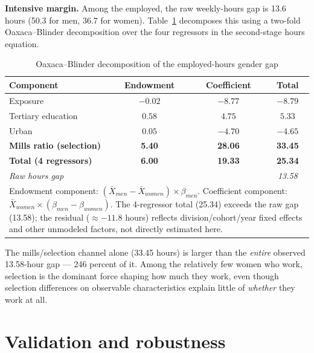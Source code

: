 \documentclass[11pt]{article}
\begin{document}
\textbf{Intensive margin.} Among the employed, the raw weekly-hours gap is 13.6 hours (50.3 for men, 36.7 for women). Table~\ref{tab:oaxaca} decomposes this using a two-fold Oaxaca--Blinder decomposition over the four regressors in the second-stage hours equation.

\begin{table}[htbp]
\centering
\caption{Oaxaca--Blinder decomposition of the employed-hours gender gap}
\label{tab:oaxaca}
\begin{tabular}{lccc}
\toprule
Component & Endowment & Coefficient & Total \\
\midrule
Exposure                        & $-0.02$ & $-8.77$ & $-8.79$ \\
Tertiary education              & $0.58$  & $4.75$  & $5.33$  \\
Urban                           & $0.05$  & $-4.70$ & $-4.65$ \\
\textbf{Mills ratio (selection)} & \textbf{5.40}  & \textbf{28.06} & \textbf{33.45} \\
\midrule
\textbf{Total (4 regressors)}    & \textbf{6.00}  & \textbf{19.33} & \textbf{25.34} \\
\emph{Raw hours gap}            &         &         & \emph{13.58}   \\
\bottomrule
\multicolumn{4}{p{0.85\textwidth}}{\footnotesize Endowment component: $(\bar{X}_{men}-\bar{X}_{women})\times\beta_{men}$. Coefficient component: $\bar{X}_{women}\times(\beta_{men}-\beta_{women})$. The 4-regressor total (25.34) exceeds the raw gap (13.58); the residual ($\approx-11.8$ hours) reflects division/cohort/year fixed effects and other unmodeled factors, not directly estimated here.}
\end{tabular}
\end{table}

The mills/selection channel alone (33.45 hours) is larger than the \emph{entire} observed 13.58-hour gap --- 246 percent of it. Among the relatively few women who work, selection is the dominant force shaping how much they work, even though selection differences on observable characteristics explain little of \emph{whether} they work at all.

\section{Validation and robustness}
\end{document}
